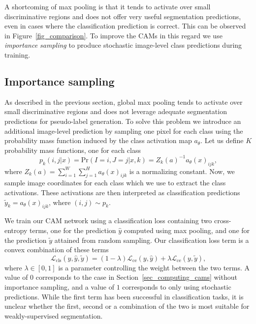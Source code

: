 \documentclass{article}
\begin{document}
A shortcoming of max pooling is that it tends to activate over small discriminative regions and does not offer very useful segmentation predictions, even in cases where the classification prediction is correct. This can be observed in Figure~\ref{fig_comparison}. To improve the CAMs in this regard we use \textit{importance sampling} to produce stochastic image-level class predictions during training.

\subsection{Importance sampling}
\label{sec_importance_sampling}

As described in the previous section, global max pooling tends to activate over small discriminative regions and does not leverage adequate segmentation predictions for pseudo-label generation. To solve this problem we introduce an additional image-level prediction by sampling one pixel for each class using the probability mass function induced by the class activation map $a_\theta$. Let us define $K$ probability mass functions, one for each class
\begin{equation}
	\label{eq_importance_sampling_pmf}
	p_k(i, j | x ) = \mathrm{Pr} (I=i, J=j | x, k) = Z_k(a)^{-1} a_\theta(x)_{ijk},
\end{equation}
where $Z_k(a) = \sum_{i=1}^W \sum_{j=1}^H a_\theta(x)_{ijk}$ is a normalizing constant. Now, we sample image coordinates for each class which we use to extract the class activations. These activations are then interpreted as classification predictions $\tilde{y}_k = a_\theta(x)_{ijk}$, where $(i, j) \sim p_k$.

We train our CAM network using a classification loss containing two cross-entropy terms, one for the prediction $\hat{y}$ computed using max pooling, and one for the prediction $\tilde{y}$ attained from random sampling. Our classification loss term is a convex combination of these terms\pagebreak
\begin{equation}
	\label{eq_cls_loss}
	\mathcal{L}_{\mathrm{cls}}(y, \hat{y}, \tilde{y}) = (1 - \lambda) \mathcal{L}_{\mathrm{ce}} (y, \hat{y}) + \lambda \mathcal{L}_{\mathrm{ce}} (y, \tilde{y}),
\end{equation}
where $\lambda \in [0, 1]$ is a parameter controlling the weight between the two terms. A value of $0$ corresponds to the case in Section~\ref{sec_computing_cams} without importance sampling, and a value of $1$ corresponds to only using stochastic predictions. While the first term has been successful in classification tasks, it is unclear whether the first, second or a combination of the two is most suitable for weakly-supervised segmentation.
\end{document}
